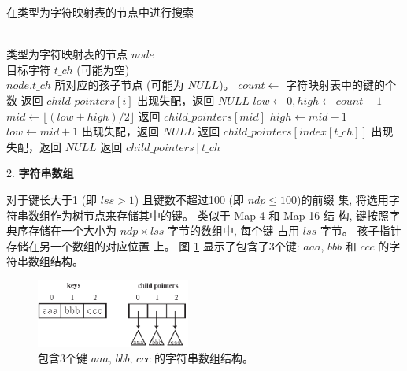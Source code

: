 \begin{algorithm}
  \caption{在类型为字符映射表的节点中进行搜索}
  \label{alg:character map}
  \begin{algorithmic}[1]
    \REQUIRE ~~\\
    类型为字符映射表的节点 $node$\\
    目标字符 $t\_ch$ (可能为空)
    \ENSURE ~~\\
     $node.t\_ch$ 所对应的孩子节点 (可能为 $NULL$)。
    \STATE
    \STATE $count \leftarrow$ 字符映射表中的键的个数
    \STATE
    \STATE 返回 $child\_pointers[i]$
    \ENDIF
    \ENDFOR
    \STATE 出现失配，返回 $NULL$
    \ENDCASE
    \STATE
    \STATE $low \leftarrow 0, high \leftarrow count-1$
    \STATE $mid \leftarrow \lfloor (low+high)/2 \rfloor$
    \STATE 返回 $child\_pointers[mid]$
    \STATE $high \leftarrow mid-1$
    \ELSE
    \STATE $low \leftarrow mid+1$
    \ENDIF
    \ENDWHILE
    \STATE 出现失配，返回 $NULL$
    \ENDCASE
    \STATE
    \STATE 返回 $child\_pointers[index[t\_ch]]$
    \ELSE
    \STATE 出现失配，返回 $NULL$
    \ENDIF
    \ENDCASE
    \STATE
    \STATE 返回 $child\_pointers[t\_ch]$
    \ENDCASE
    \ENDPWITCH
  \end{algorithmic}
\end{algorithm}

2. \textbf{字符串数组}


对于键长大于1 (即 $lss > 1$) 且键数不超过100 (即 $ndp \leq 100$)的前缀
集, 将选用字符串数组作为树节点来存储其中的键。 类似于 Map 4 和 Map 16 结
构, 键按照字典序存储在一个大小为 $ndp \times lss$ 字节的数组中, 每个键
占用 $lss$ 字节。 孩子指针存储在另一个数组的对应位置
上。 图 \ref{fig:string array} 显示了包含了3个键: $aaa$, $bbb$ 和 $ccc$
的字符串数组结构。

\begin{figure}[H]
  \centering
  \includegraphics[width=0.45\textwidth]{figures/2_MPM/string_array}
  \caption{包含3个键 $aaa,\, bbb,\, ccc$ 的字符串数组结构。}
  \label{fig:string array}
\end{figure}

